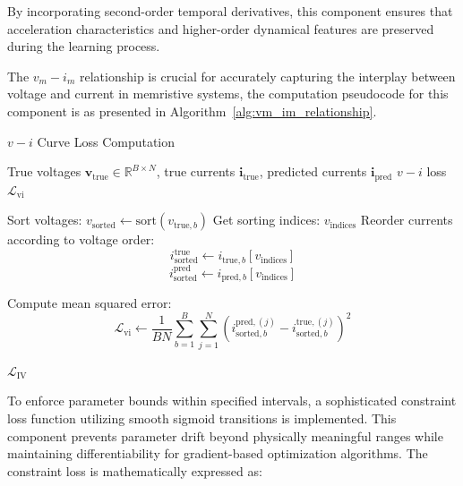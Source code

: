 \documentclass[11pt, oneside]{article}
\begin{document}
By incorporating second-order temporal derivatives, this component ensures that acceleration characteristics and higher-order dynamical features are preserved during the learning process.

The $v_m-i_m$ relationship is crucial for accurately capturing the interplay between voltage and current in memristive systems, the computation pseudocode for this component is as presented in Algorithm~\ref{alg:vm_im_relationship}.

\begin{algorithm}[H]
    \caption{$v-i$ Curve Loss Computation}
    \label{alg:vm_im_relationship}
    \begin{algorithmic}[1]
        \Require True voltages $\mathbf{v}_{\text{true}} \in \mathbb{R}^{B \times N}$, true currents $\mathbf{i}_{\text{true}}$, predicted currents $\mathbf{i}_{\text{pred}}$
        \Ensure $v - i$ loss $\mathcal{L}_{\text{vi}}$
        \Statex

        \State Sort voltages: $v_{\text{sorted}} \gets \text{sort}(v_{\text{true},b})$
        \State Get sorting indices: $v_{\text{indices}}$
        \State Reorder currents according to voltage order:
        \[
            i_{\text{sorted}}^{\text{true}} \gets i_{\text{true},b}[v_{\text{indices}}]
        \]
        \[
            i_{\text{sorted}}^{\text{pred}} \gets i_{\text{pred},b}[v_{\text{indices}}]
        \]
        \EndFor

        \State Compute mean squared error:
        \[
            \mathcal{L}_{\text{vi}} \gets \frac{1}{B N} \sum_{b=1}^{B} \sum_{j=1}^{N}
            \left( i_{\text{sorted},b}^{\text{pred},(j)} - i_{\text{sorted},b}^{\text{true},(j)} \right)^2
        \]

        \State \Return $\mathcal{L}_{\text{IV}}$
    \end{algorithmic}
\end{algorithm}
To enforce parameter bounds within specified intervals, a sophisticated constraint loss function utilizing smooth sigmoid transitions is implemented. This component prevents parameter drift beyond physically meaningful ranges while maintaining differentiability for gradient-based optimization algorithms. The constraint loss is mathematically expressed as:
\end{document}

